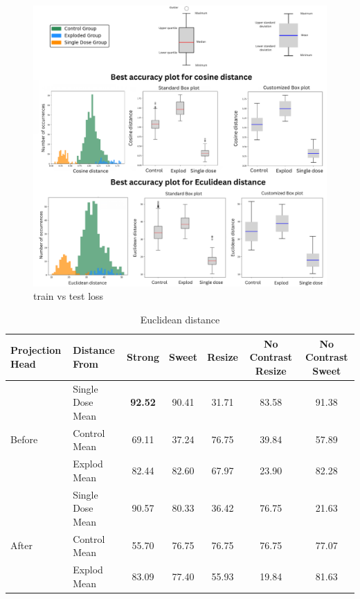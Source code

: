 \begin{figure}[H]
  \centering
  \includegraphics[scale=0.5]{figures/allbox.pdf} 
  \caption{train vs test loss}
  \label{fig:unloss}
\end{figure}



\begin{table}[H]
  \centering
  \begin{tabular}{@{}llccccc@{}}
  \toprule
  Projection Head & Distance From      & Strong & Sweet & Resize & No Contrast Resize & No Contrast Sweet \\ \midrule
                  & Single Dose Mean   & \textbf{92.52}      & 90.41     & 31.71      & 83.58                  &  91.38                \\
  Before          & Control Mean       & 69.11      & 37.24     & 76.75      & 39.84                  & 57.89                 \\
                  & Explod Mean        & 82.44      & 82.60    & 67.97      & 23.90                  & 82.28                 \\ \midrule
                  & Single Dose Mean   & 90.57     & 80.33     & 36.42      & 76.75                  & 21.63                 \\
  After           & Control Mean       & 55.70      & 76.75     & 76.75      & 76.75                  & 77.07                 \\
                  & Explod Mean        & 83.09      & 77.40     & 55.93      & 19.84                  &  81.63                \\ \bottomrule
  \end{tabular}
  \caption{Euclidean distance}
  \label{tab:table_label}
\end{table}

